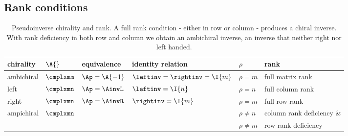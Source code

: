 \begin{landscape}
\subsection{Rank conditions}
\begin{table}[htdp]
\begin{center}
\begin{tabular}{llllll}
%
 chirality & $\A{}$ & equivalence & identity relation & $\rho$ & rank \\\hline
%
 ambichiral & $\cmplxmm$ & $\Ap = \A{-1}$ & $\leftinv = \rightinv = \I{m}$ & $\rho = m$ & full matrix rank \\
%
 left & $\cmplxmn$ & $\Ap = \AinvL$ & $\leftinv = \I{n}$ & $\rho = n$ & full column rank \\
%
 right & $\cmplxmn$ & $\Ap = \AinvR$ & $\rightinv = \I{m}$ & $\rho = m$ & full row rank \\
%
 ampichiral & $\cmplxmn$ &   & & $\rho \ne n$  & column rank deficiency \& \\
 &&& & $\rho \ne m$& row rank deficiency
%
\end{tabular}
\end{center}
\label{tab:14:experiment:a}
\caption{Pseudoinverse chirality and rank. A full rank condition - either in row or column - produces a chiral inverse. With rank deficiency in both row and column we obtain an ambichiral inverse, an inverse that neither right nor left handed.}
\end{table}%
\end{landscape}


\endinput